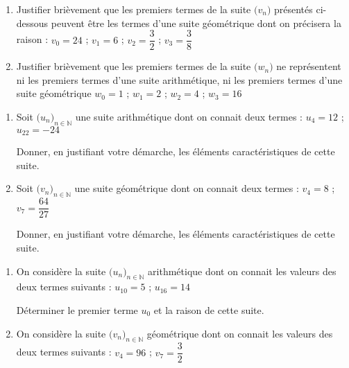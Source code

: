 \documentclass{book}
\begin{document}
\begin{multicols*}{2}
\begin{enumerate}
\item Justifier bri\`evement que les premiers termes de la suite $\big(v_n\big)$ pr\'esent\'es ci-dessous peuvent \^etre les termes d'une suite g\'eom\'etrique dont on pr\'ecisera la raison :\newline
\hglue\leftmarginii$v_0=24$%
\quad\string;\quad%
$v_1=6$%
\quad\string;\quad%
$v_2=\dfrac{3}{2}$%
\quad\string;\quad%
$v_3=\dfrac{3}{8}$%

\item Justifier bri\`evement que les premiers termes de la suite $\big(w_n\big)$ ne repr\'esentent ni les premiers termes d'une suite arithm\'etique, ni les premiers termes d'une suite g\'eom\'etrique \newline
\hglue\leftmarginii$w_0=1$%
\quad\string;\quad%
$w_1=2$%
\quad\string;\quad%
$w_2=4$%
\quad\string;\quad%
$w_3=16$%
\end{enumerate}


\leavevmode\exercice


\begin{enumerate}
\item Soit $\big(u_n\big)_{n\in\mathbb{N}}$ une suite arithm\'etique dont on connait deux termes :\newline
\hglue\leftmarginii$u_4=12$%
\quad\string;\quad%
$u_{22}=-24$

Donner, en justifiant votre d\'emarche, les \'el\'ements caract\'eristiques de cette suite.

\item Soit $\big(v_n\big)_{n\in\mathbb{N}}$ une suite g\'eom\'etrique dont on connait deux termes :\newline
\hglue\leftmarginii$v_4=8$%
\quad\string;\quad%
$v_{7}=\dfrac{64}{27}$

Donner, en justifiant votre d\'emarche, les \'el\'ements caract\'eristiques de cette suite.
\end{enumerate}

\leavevmode\exercice


\begin{enumerate}
\item On consid\`ere la suite $\big(u_n\big)_{n\in\mathbb{N}}$ arithm\'etique dont on connait les valeurs des deux termes suivants :\newline
\hglue\leftmarginii$u_{10}=5$%
\quad\string;\quad%
$u_{16}=14$

D\'eterminer le premier terme $u_0$ et la raison de cette suite.

\item On consid\`ere la suite $\big(v_n\big)_{n\in\mathbb{N}}$ g\'eom\'etrique dont on connait les valeurs des deux termes suivants :\newline
\hglue\leftmarginii$v_4=96$ %
\quad\string;\quad%
$v_7=\dfrac32$


\end{enumerate}
\end{multicols*}
\end{document}
